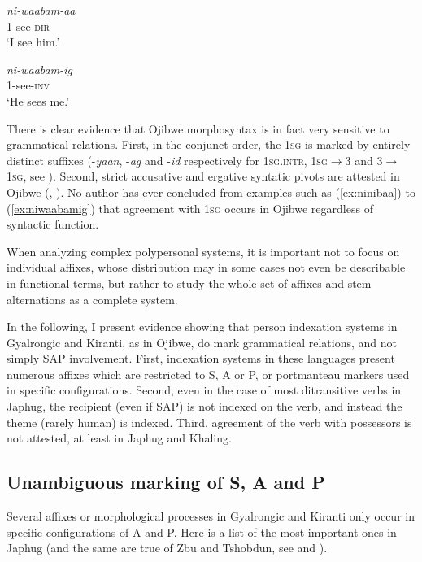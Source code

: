 \documentclass[oldfontcommands,oneside,a4paper,11pt]{article}
\begin{document}
\begin{exe}
\ex  \label{ex:niwaabamaa}
\gll \textit{ni-waabam-aa} \\
1-see-\textsc{dir} \\
\glt `I see him.'
\end{exe} 

\begin{exe}
\ex   \label{ex:niwaabamig}
\gll \textit{ni-waabam-ig} \\
1-see-\textsc{inv} \\
\glt `He sees me.'
\end{exe} 
 
There is clear evidence that Ojibwe morphosyntax is in fact very sensitive to grammatical relations. First, in the conjunct order, the \textsc{1sg} is marked by entirely distinct suffixes (-\textit{yaan}, -\textit{ag} and -\textit{id} respectively for \textsc{1sg.intr}, \textsc{1sg}$\rightarrow$3 and  3$\rightarrow$\textsc{1sg}, see \citealt[295]{valentine01grammar}). Second, strict accusative and ergative syntatic pivots are attested in Ojibwe (\citealt{rhodes94valency}, \citealt[119-126]{zuniga06}). No author has ever concluded from examples such as (\ref{ex:ninibaa}) to (\ref{ex:niwaabamig}) that agreement with \textsc{1sg} occurs in Ojibwe regardless of syntactic function.

When analyzing complex polypersonal systems, it is important not to focus on individual affixes, whose distribution may in some cases not even be describable in functional terms, but rather to study the whole set of affixes and stem alternations as a complete system. 

In the following, I present evidence showing that person indexation systems in Gyalrongic and Kiranti, as in Ojibwe, do mark grammatical relations, and not simply SAP involvement. First, indexation systems in these languages present numerous affixes which are restricted to S, A or P, or portmanteau markers used in specific configurations. Second, even in the case of most ditransitive verbs in Japhug, the recipient (even if SAP) is not indexed on the verb, and instead the theme (rarely human) is indexed. Third, agreement of the verb with possessors is not attested, at least in Japhug and Khaling.

\subsection{Unambiguous marking of S, A and P}
Several affixes or morphological processes in Gyalrongic and Kiranti only occur in specific configurations of A and P. Here is a list of the most important ones in Japhug (and the same are true of Zbu and Tshobdun, see \citealt{jackson00sidaba, jackson02rentongdengdi} and \citealt{gongxun14agreement}).
\end{document}
